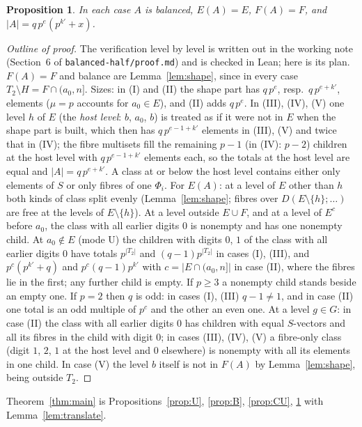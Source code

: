 \documentclass[11pt,a4paper]{amsart}
\newtheorem{proposition}[theorem]{Proposition}
\theoremstyle{definition}
\theoremstyle{remark}
\begin{document}
\begin{proposition}\label{prop:CB}
In each case $A$ is balanced, $E(A)=E$, $F(A)=F$, and $|A|=q\,p^{e}(p^{k'}+x)$.
\end{proposition}
\begin{proof}[Outline of proof]
The verification level by level is written out in the working note (Section~6 of
\texttt{balanced-half/proof.md}) and is checked in Lean; here is its plan. $F(A)=F$ and balance are Lemma~\ref{lem:shape}, since in every case $T_2\setminus H=F\cap(a_0,n]$. Sizes: in
(I) and (II) the shape part has $q\,p^{e}$, resp.\ $q\,p^{e+k'}$, elements ($\mu=p$ accounts for $a_0\in E$),
and (II) adds $q\,p^e$. In (III), (IV), (V) one level $h$ of $E$ (the \emph{host level}: $b$, $a_0$, $b$) is
treated as if it were not in $E$ when the shape part is built, which then has $q\,p^{e-1+k'}$ elements in
(III), (V) and twice that in (IV); the fibre multisets fill the remaining $p-1$ (in (IV): $p-2$) children at
the host level with $q\,p^{e-1+k'}$ elements each, so the totals at the host level are equal and
$|A|=q\,p^{e+k'}$. A class at or below the host level contains either only elements of $S$ or only fibres of
one $\Phi_i$. For $E(A)$: at a level of $E$ other than $h$ both kinds of class split evenly
(Lemma~\ref{lem:shape}; fibres over $D(E\setminus\{h\};\dots)$ are free at the levels of $E\setminus\{h\}$).
At a level outside $E\cup F$, and at a level of $E^c$ before $a_0$, the class with all earlier digits $0$ is
nonempty and has one nonempty child. At $a_0\notin E$ (mode U) the children with digits $0$, $1$ of the class with all earlier digits $0$ have totals
$p^{|T_2|}$ and $(q-1)p^{|T_2|}$ in cases (I), (III), and $p^{c}(p^{k'}+q)$ and $p^{c}(q-1)p^{k'}$ with
$c=|E\cap(a_0,n]|$ in case (II), where the fibres lie in the first; any further child is empty. If $p\ge3$ a
nonempty child stands beside an empty one. If $p=2$ then $q$ is odd: in cases (I), (III) $q-1\ne1$, and in case
(II) one total is an odd multiple of $p^c$ and the other an even one.
At a level $g\in G$: in case (II) the class with all earlier digits $0$ has children with equal $S$-vectors
and all its fibres in the child with digit $0$; in cases (III), (IV), (V) a fibre-only class (digit $1$, $2$,
$1$ at the host level and $0$ elsewhere) is nonempty with all its elements in one child. In case (V) the
level $b$ itself is not in $F(A)$ by Lemma~\ref{lem:shape}, being outside $T_2$.
\end{proof}

Theorem~\ref{thm:main} is Propositions~\ref{prop:U}, \ref{prop:B}, \ref{prop:CU}, \ref{prop:CB} with
Lemma~\ref{lem:translate}.
\end{document}
